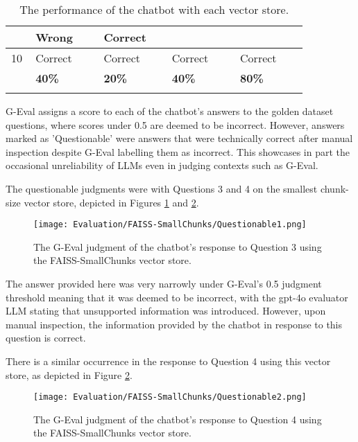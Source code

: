 \begin{longtable}{ | p{0.05\linewidth} | p{0.2\linewidth} | p{0.2\linewidth} | p{0.2\linewidth} | p{0.2\linewidth} | }
                          & \cellcolor{red!25} Wrong & \cellcolor{green!25} Correct \\
    \hline 
    \cellcolor{blue!25} 10 & \cellcolor{green!25} Correct & \cellcolor{green!25} Correct 
                           & \cellcolor{green!25} Correct & \cellcolor{green!25} Correct\\ 
    \hline
    \cellcolor{blue!25} & \cellcolor{yellow!25} \textbf{40\%} & \cellcolor{red!25} \textbf{20\%} 
    & \cellcolor{yellow!25} \textbf{40\%} & \cellcolor{green!40} \textbf{80\%} \\
    \hline
    \caption{The performance of the chatbot with each vector store.}\label{tab:ChatbotAnswers}
\end{longtable}

\para G-Eval assigns a score to each of the chatbot's answers to the golden dataset questions, where scores under 0.5 are deemed to be 
incorrect. However, answers marked as 'Questionable' were answers that were technically correct after manual inspection despite 
G-Eval labelling them as incorrect. This showcases in part the occasional unreliability of LLMs even in judging contexts 
such as G-Eval. 

\para The questionable judgments were with Questions 3 and 4 on the smallest chunk-size vector store, depicted in Figures \ref{fig:Questionable1}
and \ref{fig:Questionable2}.

\begin{figure}[H]
    \centering
    \texttt{[image: Evaluation/FAISS-SmallChunks/Questionable1.png]}
    \caption{The G-Eval judgment of the chatbot's response to Question 3 using the FAISS-SmallChunks vector store. \label{fig:Questionable1}}
\end{figure}

\noindent The answer provided here was very narrowly under G-Eval's 0.5 judgment threshold meaning that it was deemed to be incorrect, 
with the gpt-4o evaluator LLM stating that unsupported information was introduced. However, upon manual inspection, the information 
provided by the chatbot in response to this question is correct. 

\para There is a similar occurrence in the response to Question 4 using this vector store, as depicted in Figure \ref{fig:Questionable2}.

\begin{figure}[H]
    \centering
    \texttt{[image: Evaluation/FAISS-SmallChunks/Questionable2.png]}
    \caption{The G-Eval judgment of the chatbot's response to Question 4 using the FAISS-SmallChunks vector store. \label{fig:Questionable2}}
\end{figure}

